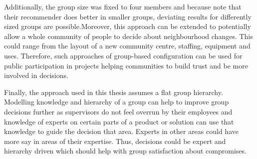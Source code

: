 Additionally, the group size was fixed to four members and because \citeauthor{choudharyMulticriteriaGroupRecommender2020} note that their recommender does better in smaller groups, deviating results for differently sized groups are possible.Moreover, this approach can be extended to potentially allow a whole community of people to decide about neighbourhood changes. This could range from the layout of a new community centre, staffing, equipment and uses. Therefore, such approaches of group-based configuration can be used for public participation in projects helping communities to build trust and be more involved in decisions.

Finally, the approach used in this thesis assumes a flat group hierarchy. Modelling knowledge and hierarchy of a group can help to improve group decisions further as supervisors do not feel overrun by their employees and knowledge of experts on certain parts of a product or solution can use that knowledge to guide the decision that area. Experts in other areas could have more say in areas of their expertise. Thus, decisions could be expert and hierarchy driven which should help with group satisfaction about compromises.
